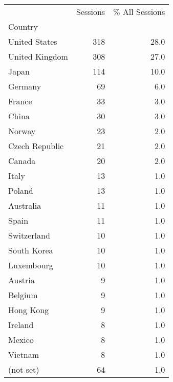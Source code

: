 \begin{tabular}{lrr}
\toprule
{} &  Sessions &  \% All Sessions \\
Country           &           &                 \\
\midrule
United States     &       318 &            28.0 \\
United Kingdom    &       308 &            27.0 \\
Japan             &       114 &            10.0 \\
Germany           &        69 &             6.0 \\
France            &        33 &             3.0 \\
China             &        30 &             3.0 \\
Norway            &        23 &             2.0 \\
Czech Republic    &        21 &             2.0 \\
Canada            &        20 &             2.0 \\
Italy             &        13 &             1.0 \\
Poland            &        13 &             1.0 \\
Australia         &        11 &             1.0 \\
Spain             &        11 &             1.0 \\
Switzerland       &        10 &             1.0 \\
South Korea       &        10 &             1.0 \\
Luxembourg        &        10 &             1.0 \\
Austria           &         9 &             1.0 \\
Belgium           &         9 &             1.0 \\
Hong Kong         &         9 &             1.0 \\
Ireland           &         8 &             1.0 \\
Mexico            &         8 &             1.0 \\
Vietnam           &         8 &             1.0 \\
(not set)         &        64 &             1.0 \\
\bottomrule
\end{tabular}
